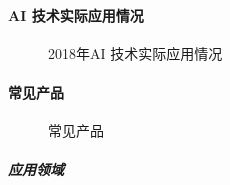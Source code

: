 \documentclass[letterpaper,11pt,english]{sphinxmanual}
\begin{document}
\paragraph{AI 技术实际应用情况}
\label{\detokenize{chapter_introduction/AI_Product:id4}}
\begin{figure}[H]
\centering
\capstart

\noindent{}
\caption{2018年AI
技术实际应用情况\sphinxfootnotemark[205]}\label{\detokenize{chapter_introduction/AI_Product:id17}}\end{figure}
%
\begin{footnotetext}[205]\sphinxAtStartFootnote
{}
%
\end{footnotetext}\ignorespaces 

\paragraph{常见产品}
\label{\detokenize{chapter_introduction/AI_Product:id5}}
\begin{figure}[H]
\centering
\capstart

\noindent{}
\caption{常见产品\sphinxfootnotemark[206]}\label{\detokenize{chapter_introduction/AI_Product:id18}}\end{figure}
%
\begin{footnotetext}[206]\sphinxAtStartFootnote
{}
%
\end{footnotetext}\ignorespaces 

\subparagraph{应用领域}
\label{\detokenize{chapter_introduction/AI_Product:id6}}
\end{document}
